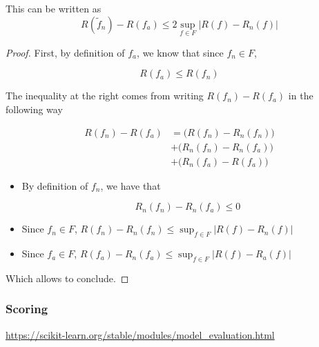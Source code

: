 \documentclass[
10pt, %
a4paper, %
oneside, %
headinclude,footinclude, %
BCOR5mm, %
]{scrartcl}
\begin{document}
    \begin{remark}
        
	This can be written as
	\begin{equation}
	    R( \tilde{f}_n)- R(f_a)\leq 2 \sup_{f\in F}|R(f)- R_n(f)|
	\end{equation}
    \end{remark}

    \begin{proof}

        First, by definition of $f_a$, we know that since $f_n\in F$,

        \begin{equation}
            R(f_a)\leq R(f_n) 
        \end{equation}

        The inequality at the right comes from writing $R(f_n)-R(f_a)$ in the
        following way

    \begin{equation}
        \begin{aligned}
	    R(f_n)-R(f_a) &= \big(R(f_n)-R_n( f_n)\big)\\
	    &+\big(R_n( f_n)- R_n(f_a)\big)\\
	    &+\big(R_n(f_a)-R(f_a)\big)
        \end{aligned}
    \end{equation}

    \begin{itemize}
        \item By definition of $f_n$, we have that

            \begin{equation}
                R_n( f_n)- R_n(f_a) \leq 0
            \end{equation}
        \item Since $f_n\in F$, $R(f_n)-R_n( f_n)\leq \sup_{f\in F}|R(f)- R_n(f)| $
        \item Since $f_a\in F$, $R(f_a)-R_n( f_a)\leq \sup_{f\in F}|R(f)- R_a(f)| $
    \end{itemize}

        Which allows to conclude.
    \end{proof}

    \subsubsection{\large\color{Periwinkle}Scoring}

    \url{https://scikit-learn.org/stable/modules/model_evaluation.html} 
\end{document}
